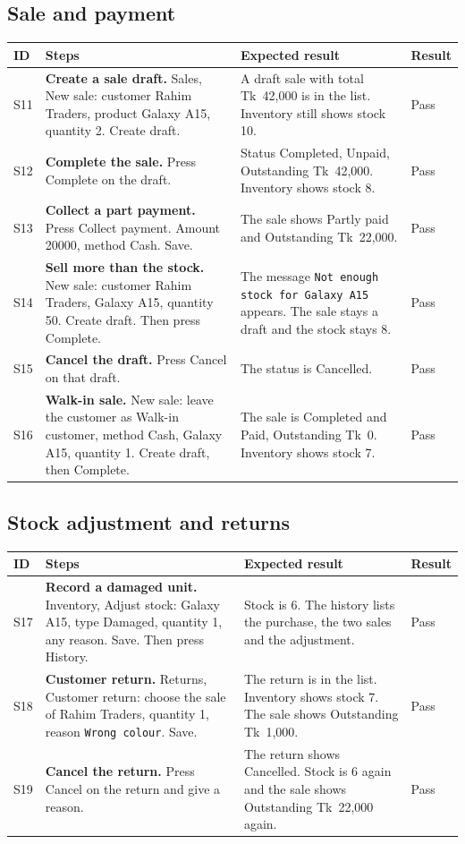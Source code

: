 \documentclass[11pt,a4paper]{article}
\newcommand{\code}[1]{\texttt{#1}}
\begin{document}
\subsection{Sale and payment}
\begin{longtable}{@{}P{0.75cm}P{6.0cm}P{5.3cm}P{1.3cm}@{}}
\toprule
\textbf{ID} & \textbf{Steps} & \textbf{Expected result} & \textbf{Result} \\
\midrule
\endhead
S11 & \textbf{Create a sale draft.} Sales, New sale: customer Rahim Traders, product Galaxy A15, quantity 2. Create draft. & A draft sale with total Tk~42,000 is in the list. Inventory still shows stock 10. & Pass \\\addlinespace
S12 & \textbf{Complete the sale.} Press Complete on the draft. & Status Completed, Unpaid, Outstanding Tk~42,000. Inventory shows stock 8. & Pass \\\addlinespace
S13 & \textbf{Collect a part payment.} Press Collect payment. Amount 20000, method Cash. Save. & The sale shows Partly paid and Outstanding Tk~22,000. & Pass \\\addlinespace
S14 & \textbf{Sell more than the stock.} New sale: customer Rahim Traders, Galaxy A15, quantity 50. Create draft. Then press Complete. & The message \code{Not enough stock for Galaxy A15} appears. The sale stays a draft and the stock stays 8. & Pass \\\addlinespace
S15 & \textbf{Cancel the draft.} Press Cancel on that draft. & The status is Cancelled. & Pass \\\addlinespace
S16 & \textbf{Walk-in sale.} New sale: leave the customer as Walk-in customer, method Cash, Galaxy A15, quantity 1. Create draft, then Complete. & The sale is Completed and Paid, Outstanding Tk~0. Inventory shows stock 7. & Pass \\*
\bottomrule
\end{longtable}

\subsection{Stock adjustment and returns}
\begin{longtable}{@{}P{0.75cm}P{6.0cm}P{5.3cm}P{1.3cm}@{}}
\toprule
\textbf{ID} & \textbf{Steps} & \textbf{Expected result} & \textbf{Result} \\
\midrule
\endhead
S17 & \textbf{Record a damaged unit.} Inventory, Adjust stock: Galaxy A15, type Damaged, quantity 1, any reason. Save. Then press History. & Stock is 6. The history lists the purchase, the two sales and the adjustment. & Pass \\\addlinespace
S18 & \textbf{Customer return.} Returns, Customer return: choose the sale of Rahim Traders, quantity 1, reason \code{Wrong colour}. Save. & The return is in the list. Inventory shows stock 7. The sale shows Outstanding Tk~1,000. & Pass \\\addlinespace
S19 & \textbf{Cancel the return.} Press Cancel on the return and give a reason. & The return shows Cancelled. Stock is 6 again and the sale shows Outstanding Tk~22,000 again. & Pass \\*
\bottomrule
\end{longtable}
\end{document}
